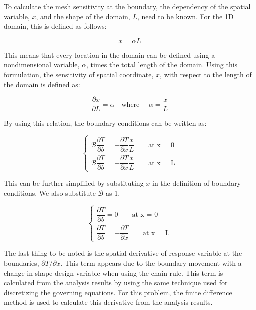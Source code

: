 To calculate the mesh sensitivity at the boundary, the dependency of the spatial variable, $x$, and the shape of the domain, $L$, need to be known. For the 1D domain, this is defined as follows:

\begin{equation*}
    x = \alpha L
\end{equation*}

This means that every location in the domain can be defined using a nondimensional variable, $\alpha$, times the total length of the domain. Using this formulation, the sensitivity of spatial coordinate, $x$, with respect to the length of the domain is defined as:

\begin{equation*}
    \frac{\partial x}{\partial L} = \alpha \quad \text{where } \quad \alpha = \frac{x}{L}
\end{equation*}

By using this relation, the boundary conditions can be written as:

\begin{equation*}
\begin{cases}
    \mathcal{B} \dfrac{\partial T}{\partial b} = -\dfrac{\partial T}{\partial x} \dfrac{x}{L} \qquad \text{at x = 0}
    \\
    \mathcal{B} \dfrac{\partial T}{\partial b} = -\dfrac{\partial T}{\partial x} \dfrac{x}{L} \qquad \text{at x = L}
\end{cases}
\end{equation*}

This can be further simplified by substituting $x$ in the definition of boundary conditions. We also substitute $\mathcal{B}$ as 1.

\begin{equation}\label{eq:C2_laplaceSAboundaryCondition}
\begin{cases}
    \dfrac{\partial T}{\partial b} = 0 \qquad \text{at x = 0}
    \\
    \dfrac{\partial T}{\partial b} = -\dfrac{\partial T}{\partial x} \qquad \text{at x = L}
\end{cases}
\end{equation}

The last thing to be noted is the spatial derivative of response variable at the boundaries, $\partial T/\partial x$. This term appears due to the boundary movement with a change in shape design variable when using the chain rule. This term is calculated from the analysis results by using the same technique used for discretizing the governing equations. For this problem, the finite difference method is used to calculate this derivative from the analysis results.

